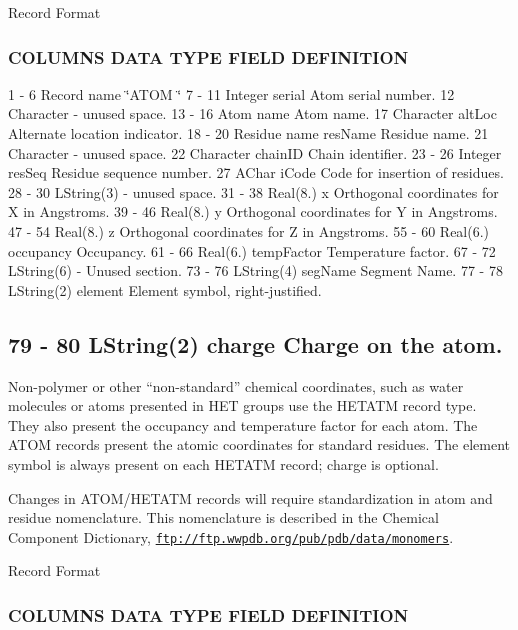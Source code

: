 Record Format

\subsubsection*{C\-O\-L\-U\-M\-N\-S D\-A\-T\-A T\-Y\-P\-E F\-I\-E\-L\-D D\-E\-F\-I\-N\-I\-T\-I\-O\-N}

1 -\/ 6 Record name \char`\"{}\-A\-T\-O\-M  \char`\"{} 7 -\/ 11 Integer serial Atom serial number. 12 Character -\/ unused space. 13 -\/ 16 Atom name Atom name. 17 Character alt\-Loc Alternate location indicator. 18 -\/ 20 Residue name res\-Name Residue name. 21 Character -\/ unused space. 22 Character chain\-I\-D Chain identifier. 23 -\/ 26 Integer res\-Seq Residue sequence number. 27 A\-Char i\-Code Code for insertion of residues. 28 -\/ 30 L\-String(3) -\/ unused space. 31 -\/ 38 Real(8.) x Orthogonal coordinates for X in Angstroms. 39 -\/ 46 Real(8.) y Orthogonal coordinates for Y in Angstroms. 47 -\/ 54 Real(8.) z Orthogonal coordinates for Z in Angstroms. 55 -\/ 60 Real(6.) occupancy Occupancy. 61 -\/ 66 Real(6.) temp\-Factor Temperature factor. 67 -\/ 72 L\-String(6) -\/ Unused section. 73 -\/ 76 L\-String(4) seg\-Name Segment Name. 77 -\/ 78 L\-String(2) element Element symbol, right-\/justified. \subsection*{79 -\/ 80 L\-String(2) charge Charge on the atom.}

Non-\/polymer or other “non-\/standard” chemical coordinates, such as water molecules or atoms presented in H\-E\-T groups use the H\-E\-T\-A\-T\-M record type. They also present the occupancy and temperature factor for each atom. The A\-T\-O\-M records present the atomic coordinates for standard residues. The element symbol is always present on each H\-E\-T\-A\-T\-M record; charge is optional.

Changes in A\-T\-O\-M/\-H\-E\-T\-A\-T\-M records will require standardization in atom and residue nomenclature. This nomenclature is described in the Chemical Component Dictionary, \href{ftp://ftp.wwpdb.org/pub/pdb/data/monomers}{\tt ftp\-://ftp.\-wwpdb.\-org/pub/pdb/data/monomers}.

Record Format

\subsubsection*{C\-O\-L\-U\-M\-N\-S D\-A\-T\-A T\-Y\-P\-E F\-I\-E\-L\-D D\-E\-F\-I\-N\-I\-T\-I\-O\-N}

